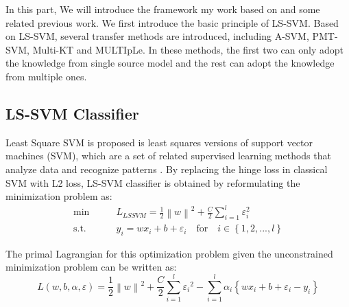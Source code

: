 In this part, We will introduce the framework my work based on and some related previous work. We first introduce the basic principle of LS-SVM. Based on LS-SVM, several transfer methods are introduced, including A-SVM, PMT-SVM, Multi-KT and MULTIpLe. In these methods, the first two can only adopt the knowledge from single source model and the rest can adopt the knowledge from multiple ones.
\subsection{LS-SVM Classifier}
Least Square SVM is proposed is least squares versions of support vector machines (SVM), which are a set of related supervised learning methods that analyze data and recognize patterns \cite{suykens1999least}. By replacing the hinge loss in classical SVM with L2 loss, LS-SVM classifier is obtained by reformulating the minimization problem as: 
\begin{equation}\label{eq:gama:lssvm}
\begin{aligned}
\min \qquad& L_{LSSVM} = \frac{1}{2}{\left\| w \right\|^2} + \frac{C}{2}\sum\limits_{i = 1}^l {{\varepsilon_i ^2}}\\
\text{s.t.}\qquad&{y_i} = w{x_i} + b + {\varepsilon _i} \quad   \text{for} \quad i \in \left\{ {1,2,...,l} \right\}
\end{aligned}
\end{equation}

The primal Lagrangian for this optimization problem given the unconstrained minimization problem can be written as:
\begin{equation}\label{sq:gama:lsprime}
  L\left( {w,b,\alpha ,\varepsilon } \right) = \frac{1}{2}{\left\| w \right\|^2} + \frac{C}{2}\sum\limits_{i = 1}^l {{\varepsilon _i}^2}  - \sum\limits_{i = 1}^l {{\alpha _i}\left\{ {w{x_i} + b + {\varepsilon _i} - {y_i}} \right\}}
\end{equation}

